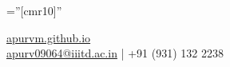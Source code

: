 \documentclass[a4paper,10pt]{article} %
\begin{document}
\pagestyle{empty} %

\font\fb=''[cmr10]'' %

\par{\par} %
\center {}\href{https://apurvm.github.io}{apurvm.github.io}\\
\href{mailto:apurv09064@iiitd.ac.in}{apurv09064@iiitd.ac.in} | +91 (931) 132 2238 %


\end{document}
